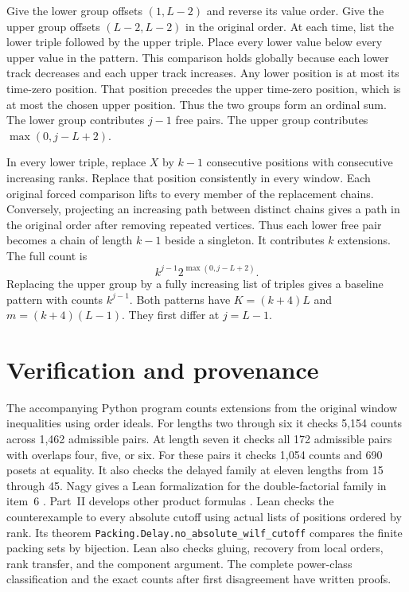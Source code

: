 \documentclass[11pt]{article}
\begin{document}
Give the lower group offsets $(1,L-2)$ and reverse its value order.
Give the upper group offsets $(L-2,L-2)$ in the original order.
At each time, list the lower triple followed by the upper triple.
Place every lower value below every upper value in the pattern.
This comparison holds globally because each lower track decreases and each upper track increases.
Any lower position is at most its time-zero position.
That position precedes the upper time-zero position, which is at most the chosen upper position.
Thus the two groups form an ordinal sum.
The lower group contributes $j-1$ free pairs. The upper group contributes $\max(0,j-L+2)$.

In every lower triple, replace $X$ by $k-1$ consecutive positions with consecutive increasing ranks.
Replace that position consistently in every window. Each original forced comparison lifts to every member of the replacement chains.
Conversely, projecting an increasing path between distinct chains gives a path in the original order after removing repeated vertices.
Thus each lower free pair becomes a chain of length $k-1$ beside a singleton.
It contributes $k$ extensions. The full count is
\[
 k^{j-1}2^{\max(0,j-L+2)}.
\]
Replacing the upper group by a fully increasing list of triples gives a baseline pattern with counts $k^{j-1}$.
Both patterns have $K=(k+4)L$ and $m=(k+4)(L-1)$. They first differ at $j=L-1$.

\section*{Verification and provenance}
The accompanying Python program counts extensions from the original window inequalities using order ideals.
For lengths two through six it checks 5,154 counts across 1,462 admissible pairs.
At length seven it checks all 172 admissible pairs with overlaps four, five, or six.
For these pairs it checks 1,054 counts and 690 posets at equality.
It also checks the delayed family at eleven lengths from 15 through 45.
Nagy gives a Lean formalization for the double-factorial family in item~6 \cite{nagy}. Part~II develops other product formulas \cite{bks2}.
Lean checks the counterexample to every absolute cutoff using actual lists of positions ordered by rank.
Its theorem \texttt{Packing.Delay.no\_absolute\_wilf\_cutoff} compares the finite packing sets by bijection.
Lean also checks gluing, recovery from local orders, rank transfer, and the component argument.
The complete power-class classification and the exact counts after first disagreement have written proofs.
\end{document}
